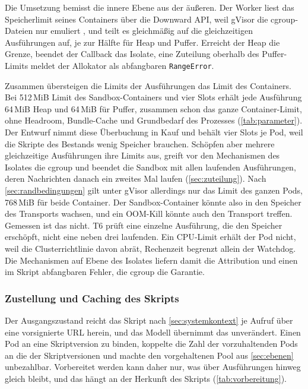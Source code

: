 Die Umsetzung bemisst die innere Ebene aus der äußeren. Der Worker liest das Speicherlimit seines Containers über die
Downward \ac{API}, weil gVisor die cgroup-Dateien nur emuliert \autocite{googlegvisor_contributors_sandboxed_2026}, und
teilt es gleichmäßig auf die gleichzeitigen Ausführungen auf, je zur Hälfte für Heap und Puffer. Erreicht der Heap die
Grenze, beendet der Callback das Isolate, eine Zuteilung oberhalb des Puffer-Limits meldet der Allokator als
abfangbaren \texttt{RangeError}.

Zusammen übersteigen die Limits der Ausführungen das Limit des Containers. Bei 512\,MiB Limit des Sandbox-Containers und vier Slots erhält
jede Ausführung 64\,MiB Heap und 64\,MiB für Puffer, zusammen schon das ganze Container-Limit, ohne Headroom, Bundle-Cache und
Grundbedarf des Prozesses (\autoref{tab:parameter}). Der Entwurf nimmt diese Überbuchung in Kauf und behält vier Slots
je Pod, weil die Skripte des Bestands wenig Speicher brauchen. Schöpfen aber mehrere gleichzeitige Ausführungen ihre
Limits aus, greift vor den Mechanismen des Isolates die cgroup und beendet die Sandbox mit allen laufenden Ausführungen,
deren Nachrichten danach ein zweites Mal laufen (\autoref{sec:zuteilung}). Nach \autoref{sec:randbedingungen} gilt unter gVisor
allerdings nur das Limit des ganzen Pods, 768\,MiB für beide Container. Der Sandbox-Container könnte also in den Speicher des
Transports wachsen, und ein \ac{OOM}-Kill könnte auch den Transport treffen. Gemessen ist das nicht. T6 prüft eine einzelne Ausführung, die den
Speicher erschöpft, nicht eine neben drei laufenden. Ein \ac{CPU}-Limit erhält der Pod nicht, weil die
Clusterrichtlinie davon abrät, Rechenzeit begrenzt allein der Watchdog. Die Mechanismen auf Ebene des Isolates liefern
damit die Attribution und einen im Skript abfangbaren Fehler, die cgroup die Garantie.

\subsubsection{Zustellung und Caching des Skripts}
\label{sec:zustellung}

Der Ausgangszustand reicht das Skript nach \autoref{sec:systemkontext} je Aufruf über eine vorsignierte \ac{URL}
herein, und das Modell übernimmt das unverändert. Einen Pod an eine Skriptversion zu binden, koppelte die Zahl der
vorzuhaltenden Pods an die der Skriptversionen und machte den vorgehaltenen Pool aus \autoref{sec:ebenen}
unbezahlbar. Vorbereitet werden kann daher nur, was über Ausführungen hinweg gleich bleibt, und das hängt an der
Herkunft des Skripts (\autoref{tab:vorbereitung}).

